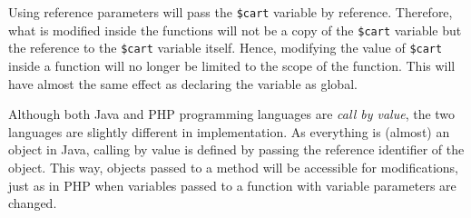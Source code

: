 \begin{enumerate}
Using reference parameters will pass the \texttt{\$cart} variable by reference. Therefore, what is modified inside the functions will not be a copy of the \texttt{\$cart} variable but the reference to the \texttt{\$cart} variable itself. Hence, modifying the value of \texttt{\$cart} inside a function will no longer be limited to the scope of the function. This will have almost the same effect as declaring the variable as global.

Although both Java and PHP programming languages are \textit{call by value}, the two languages are slightly different in implementation. As everything is (almost) an object in Java, calling by value is defined by passing the reference identifier of the object. This way, objects passed to a method will be accessible for modifications, just as in PHP when variables passed to a function with variable parameters are changed.
\end{enumerate}
